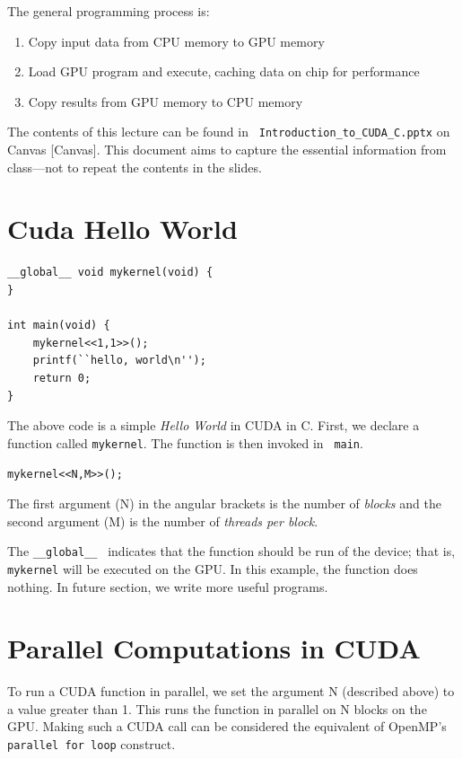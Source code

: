 \documentclass[twoside]{article}
\begin{document}
The general programming process is:

\begin{enumerate}
    \item Copy input data from CPU memory to GPU memory
    \item Load GPU program and execute,caching data on chip for performance
    \item Copy results from GPU memory to CPU memory
\end{enumerate}

The contents of this lecture can be found in {\tt
Introduction\_to\_CUDA\_C.pptx} on Canvas [Canvas]. This document aims to capture the
essential information from class---not to repeat the contents in the slides.

\section{Cuda Hello World}

\begin{verbatim}
__global__ void mykernel(void) {
}

int main(void) {
    mykernel<<1,1>>();
    printf(``hello, world\n'');
    return 0;
}
\end{verbatim}

The above code is a simple {\it Hello World} in CUDA in C. First, we declare
a function called {\tt mykernel}. The function is then invoked in {\tt
main}. 

\begin{center}
    {{\tt mykernel<<N,M>>(); }}
\end{center}


The first argument (N) in the angular brackets is the number of {\it
blocks} and the second argument (M) is the number of {\it threads per block}.

The {\tt \_\_global\_\_ } indicates that the function should be run of the
device; that is, {\tt mykernel} will be executed on the GPU. In this example,
the function does nothing. In future section, we write more useful programs.

\section{Parallel Computations in CUDA}

To run a CUDA function in parallel, we set the argument N (described above) to
a value greater than 1. This runs the function in parallel on N blocks on
the GPU. Making such a CUDA call can be considered the
equivalent of OpenMP's {\tt parallel for loop} construct.
\end{document}
